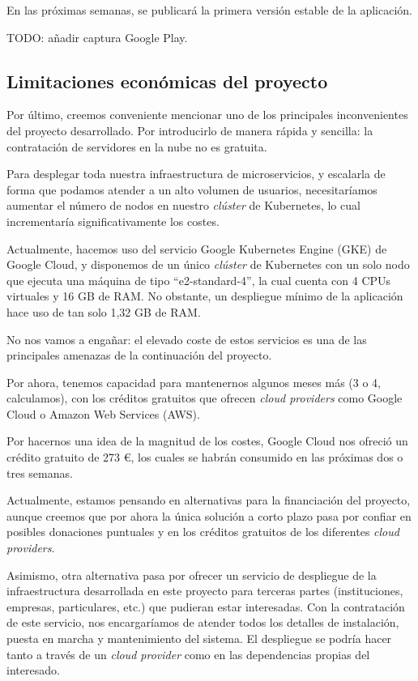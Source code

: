 En las próximas semanas, se publicará la primera versión estable de la aplicación.

TODO: añadir captura Google Play.


\subsection{Limitaciones económicas del proyecto}

Por último, creemos conveniente mencionar uno de los principales inconvenientes del proyecto desarrollado. Por introducirlo de manera rápida y sencilla: la contratación de servidores en la nube no es gratuita.

Para desplegar toda nuestra infraestructura de microservicios, y escalarla de forma que podamos atender a un alto volumen de usuarios, necesitaríamos aumentar el número de nodos en nuestro \emph{clúster} de Kubernetes, lo cual incrementaría significativamente los costes.

Actualmente, hacemos uso del servicio Google Kubernetes Engine (GKE) de Google Cloud, y disponemos de un único \emph{clúster} de Kubernetes con un solo nodo que ejecuta una máquina de tipo ``e2-standard-4'', la cual cuenta con 4 CPUs virtuales y 16 GB de RAM. No obstante, un despliegue mínimo de la aplicación hace uso de tan solo 1,32 GB de RAM.

No nos vamos a engañar: el elevado coste de estos servicios es una de las principales amenazas de la continuación del proyecto.

Por ahora, tenemos capacidad para mantenernos algunos meses más (3 o 4, calculamos), con los créditos gratuitos que ofrecen \emph{cloud providers} como Google Cloud o Amazon Web Services (AWS).

Por hacernos una idea de la magnitud de los costes, Google Cloud nos ofreció un crédito gratuito de 273 €, los cuales se habrán consumido en las próximas dos o tres semanas.

Actualmente, estamos pensando en alternativas para la financiación del proyecto, aunque creemos que por ahora la única solución a corto plazo pasa por confiar en posibles donaciones puntuales y en los créditos gratuitos de los diferentes \emph{cloud providers}.

Asimismo, otra alternativa pasa por ofrecer un servicio de despliegue de la infraestructura desarrollada en este proyecto para terceras partes (instituciones, empresas, particulares, etc.) que pudieran estar interesadas. Con la contratación de este servicio, nos encargaríamos de atender todos los detalles de instalación, puesta en marcha y mantenimiento del sistema. El despliegue se podría hacer tanto a través de un \emph{cloud provider} como en las dependencias propias del interesado.